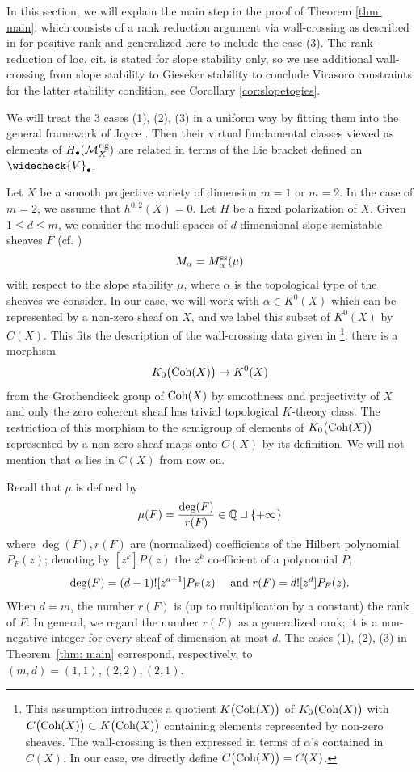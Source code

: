 \documentclass[a4paper, 12pt]{amsart}
\begin{document}
In this section, we will explain the main step in the proof of Theorem \ref{thm: main}, which consists of a rank reduction argument via wall-crossing as described in \cite[Section 8.6]{Jo21} for positive rank and generalized here to include the case (3). The rank-reduction of loc. cit. is stated for slope stability only, so we use additional wall-crossing from slope stability to Gieseker stability to conclude Virasoro constraints for the latter stability condition, see Corollary \ref{cor:slopetogies}.

We will treat the 3 cases (1), (2), (3) in a uniform way by fitting them into the general framework of Joyce \cite{Jo21}.  Then their virtual fundamental classes viewed as elements of $H_{\bullet}({\mathcal M}^{\mathrm{rig}}_X)$ are related in terms of the Lie bracket defined on $\widecheck{V}_\bullet$. 

Let $X$ be a smooth projective variety of dimension $m=1$ or $m=2$. In the case of $m=2$, we assume that $h^{0,2}(X)=0$. Let $H$ be a fixed polarization of $X$. Given $1\leq d\leq m$, we consider the moduli spaces of $d$-dimensional slope semistable sheaves $F$ (cf. \cite[Theorem 4.3.4, Definition 8.2.7]{HL})
$$M_\alpha=M_\alpha^{\textup{ss}}(\mu)$$
with respect to the slope stability $\mu$, where $\alpha$ is the topological type of the sheaves we consider. In our case, we will work with $\alpha \in K^0(X)$ which can be represented by a non-zero sheaf on $X$, and we label this subset of $K^0(X)$ by $C(X)$. This fits the description of the wall-crossing data given in \cite[Assumption 5.1 (b)]{Jo21}\footnote{This assumption introduces a quotient $K\big(\mathrm{Coh}(X)\big)$ of $K_0\big(\mathrm{Coh}(X)\big)$  with $C\big(\mathrm{Coh}(X)\big)\subset K\big(\mathrm{Coh}(X)\big)$ containing elements represented by non-zero sheaves. The wall-crossing is then expressed in terms of $\alpha$'s contained in $C(X)$. In our case, we directly define $C\big(\mathrm{Coh}(X)\big) =C(X)$.}: there is a morphism 
$$
K_{0}\big(\mathrm{Coh}(X)\big)\to K^0(X)
$$
from the Grothendieck group of $\mathrm{Coh}(X)$ by smoothness and projectivity of $X$ and only the zero coherent sheaf has trivial topological $K$-theory class. The restriction of this morphism to the semigroup of elements of $K_{0}\big(\mathrm{Coh}(X)\big)$ represented by a non-zero sheaf maps onto $C(X)$ by its definition. We will not mention that $\alpha$ lies in $C(X)$ from now on. 

Recall that $\mu$ is defined by
\[\mu(F)=\frac{\deg(F)}{r(F)}\in {\mathbb{Q}}\sqcup\{+\infty\}\]
where $\deg(F), r(F)$ are (normalized) coefficients of the Hilbert polynomial $P_F(z)$; denoting by $[z^k]P(z)$ the $z^k$ coefficient of a polynomial $P$,
\[\deg(F)=(d-1)![z^{d-1}]P_F(z) \quad \textup{ and } r(F)=d![z^{d}]P_F(z).\]
When $d=m$, the number $r(F)$ is (up to multiplication by a constant) the rank of $F$. In general, we regard the number $r(F)$ as a generalized rank; it is a non-negative integer for every sheaf of dimension at most $d$. The cases (1), (2), (3) in Theorem~\ref{thm: main} correspond, respectively, to $(m,d)=(1,1), (2,2), (2,1)$.
\end{document}
